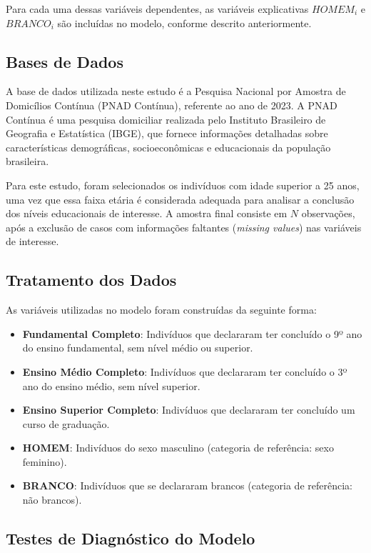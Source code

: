 \documentclass[a4paper,12pt]{article}
\begin{document}
Para cada uma dessas variáveis dependentes, as variáveis explicativas \( HOMEM_i \) e \( BRANCO_i \) são incluídas no modelo, conforme descrito anteriormente.

\subsection{Bases de Dados}

A base de dados utilizada neste estudo é a Pesquisa Nacional por Amostra de Domicílios Contínua (PNAD Contínua), referente ao ano de 2023. A PNAD Contínua é uma pesquisa domiciliar realizada pelo Instituto Brasileiro de Geografia e Estatística (IBGE), que fornece informações detalhadas sobre características demográficas, socioeconômicas e educacionais da população brasileira.

Para este estudo, foram selecionados os indivíduos com idade superior a 25 anos, uma vez que essa faixa etária é considerada adequada para analisar a conclusão dos níveis educacionais de interesse. A amostra final consiste em \( N \) observações, após a exclusão de casos com informações faltantes (\textit{missing values}) nas variáveis de interesse.

\subsection{Tratamento dos Dados}

As variáveis utilizadas no modelo foram construídas da seguinte forma:
\begin{itemize}
    \item \textbf{Fundamental Completo}: Indivíduos que declararam ter concluído o 9º ano do ensino fundamental, sem nível médio ou superior.
    \item \textbf{Ensino Médio Completo}: Indivíduos que declararam ter concluído o 3º ano do ensino médio, sem nível superior.
    \item \textbf{Ensino Superior Completo}: Indivíduos que declararam ter concluído um curso de graduação.
    \item \textbf{HOMEM}: Indivíduos do sexo masculino (categoria de referência: sexo feminino).
    \item \textbf{BRANCO}: Indivíduos que se declararam brancos (categoria de referência: não brancos).
\end{itemize}

\subsection{Testes de Diagnóstico do Modelo}
\end{document}
